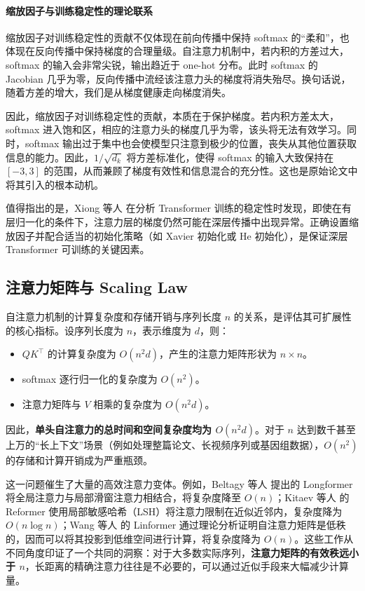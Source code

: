 \paragraph{缩放因子与训练稳定性的理论联系}

缩放因子对训练稳定性的贡献不仅体现在前向传播中保持 softmax 的“柔和”，也体现在反向传播中保持梯度的合理量级。自注意力机制中，若内积的方差过大，softmax 的输入会非常尖锐，输出趋近于 one-hot 分布。此时 softmax 的 Jacobian 几乎为零，反向传播中流经该注意力头的梯度将消失殆尽。换句话说，随着方差的增大，我们是从梯度健康走向梯度消失。

因此，缩放因子对训练稳定性的贡献，本质在于保护梯度。若内积方差太大，softmax 进入饱和区，相应的注意力头的梯度几乎为零，该头将无法有效学习。同时，softmax 输出过于集中也会使模型只注意到极少的位置，丧失从其他位置获取信息的能力。因此，$1/\sqrt{d_k}$ 将方差标准化，使得 softmax 的输入大致保持在 $[-3, 3]$ 的范围，从而兼顾了梯度有效性和信息混合的充分性。这也是原始论文中将其引入的根本动机。

值得指出的是，Xiong 等人\cite{xiong2020layernormalizationtransformerarchitecture} 在分析 Transformer 训练的稳定性时发现，即使在有层归一化的条件下，注意力层的梯度仍然可能在深层传播中出现异常。正确设置缩放因子并配合适当的初始化策略（如 Xavier 初始化或 He 初始化），是保证深层 Transformer 可训练的关键因素。

\subsection{注意力矩阵与 Scaling Law}

自注意力机制的计算复杂度和存储开销与序列长度 $n$ 的关系，是评估其可扩展性的核心指标。设序列长度为 $n$，表示维度为 $d$，则：
\begin{itemize}
    \item $QK^\top$ 的计算复杂度为 $O(n^2 d)$，产生的注意力矩阵形状为 $n\times n$。
    \item softmax 逐行归一化的复杂度为 $O(n^2)$。
    \item 注意力矩阵与 $V$ 相乘的复杂度为 $O(n^2 d)$。
\end{itemize}
因此，\textbf{单头自注意力的总时间和空间复杂度均为 $O(n^2 d)$}。对于 $n$ 达到数千甚至上万的“长上下文”场景（例如处理整篇论文、长视频序列或基因组数据），$O(n^2)$ 的存储和计算开销成为严重瓶颈。

这一问题催生了大量的高效注意力变体。例如，Beltagy 等人\cite{beltagy2020longformerlongdocumenttransformer} 提出的 Longformer 将全局注意力与局部滑窗注意力相结合，将复杂度降至 $O(n)$；Kitaev 等人\cite{kitaev2020reformerefficienttransformer} 的 Reformer 使用局部敏感哈希（LSH）将注意力限制在近似近邻内，复杂度降为 $O(n\log n)$；Wang 等人\cite{wang2020linformerselfattentionlinearcomplexity} 的 Linformer 通过理论分析证明自注意力矩阵是低秩的，因而可以将其投影到低维空间进行计算，将复杂度降为 $O(n)$。这些工作从不同角度印证了一个共同的洞察：对于大多数实际序列，\textbf{注意力矩阵的有效秩远小于 $n$}，长距离的精确注意力往往是不必要的，可以通过近似手段来大幅减少计算量。


